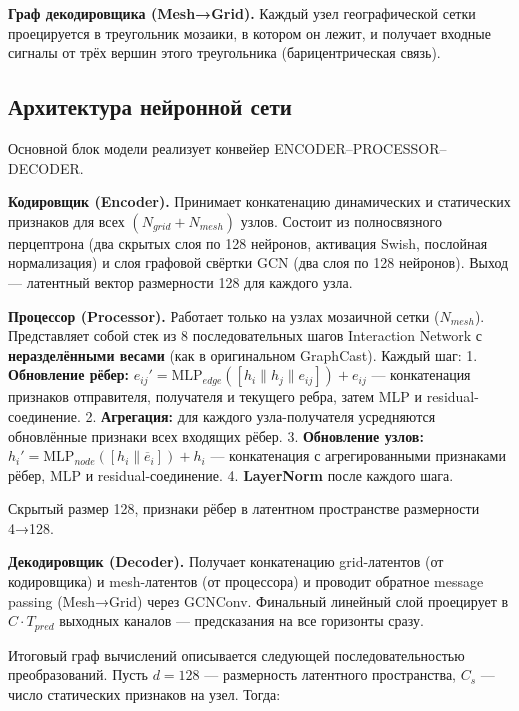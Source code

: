 \documentclass[14pt,a4paper]{extarticle}
\numberwithin{table}{section}
\numberwithin{figure}{section}
\numberwithin{equation}{section}
\begin{document}
\textbf{Граф декодировщика (Mesh→Grid).} Каждый узел географической
сетки проецируется в треугольник мозаики, в котором он лежит, и получает
входные сигналы от трёх вершин этого треугольника (барицентрическая
связь).

\subsection{Архитектура нейронной сети}\label{ux430ux440ux445ux438ux442ux435ux43aux442ux443ux440ux430-ux43dux435ux439ux440ux43eux43dux43dux43eux439-ux441ux435ux442ux438}

Основной блок модели реализует конвейер ENCODER--PROCESSOR--DECODER.

\textbf{Кодировщик (Encoder).} Принимает конкатенацию динамических и
статических признаков для всех \((N_{grid} + N_{mesh})\) узлов. Состоит
из полносвязного перцептрона (два скрытых слоя по 128 нейронов,
активация Swish, послойная нормализация) и слоя графовой свёртки GCN
(два слоя по 128 нейронов). Выход --- латентный вектор размерности 128
для каждого узла.

\textbf{Процессор (Processor).} Работает только на узлах мозаичной сетки
(\(N_{mesh}\)). Представляет собой стек из 8 последовательных шагов
Interaction Network с \textbf{неразделёнными весами} (как в оригинальном
GraphCast). Каждый шаг: 1. \textbf{Обновление рёбер:}
\(e_{ij}' = \text{MLP}_{edge}([h_i \| h_j \| e_{ij}]) + e_{ij}\) ---
конкатенация признаков отправителя, получателя и текущего ребра, затем
MLP и residual-соединение. 2. \textbf{Агрегация:} для каждого
узла-получателя усредняются обновлённые признаки всех входящих рёбер. 3.
\textbf{Обновление узлов:}
\(h_i' = \text{MLP}_{node}([h_i \| \overline{e}_i]) + h_i\) ---
конкатенация с агрегированными признаками рёбер, MLP и
residual-соединение. 4. \textbf{LayerNorm} после каждого шага.

Скрытый размер 128, признаки рёбер в латентном пространстве размерности
4→128.

\textbf{Декодировщик (Decoder).} Получает конкатенацию grid-латентов (от
кодировщика) и mesh-латентов (от процессора) и проводит обратное message
passing (Mesh→Grid) через GCNConv. Финальный линейный слой проецирует в
\(C \cdot T_{pred}\) выходных каналов --- предсказания на все горизонты
сразу.

Итоговый граф вычислений описывается следующей последовательностью
преобразований. Пусть \(d = 128\) --- размерность латентного
пространства, \(C_s\) --- число статических признаков на узел. Тогда:
\end{document}
